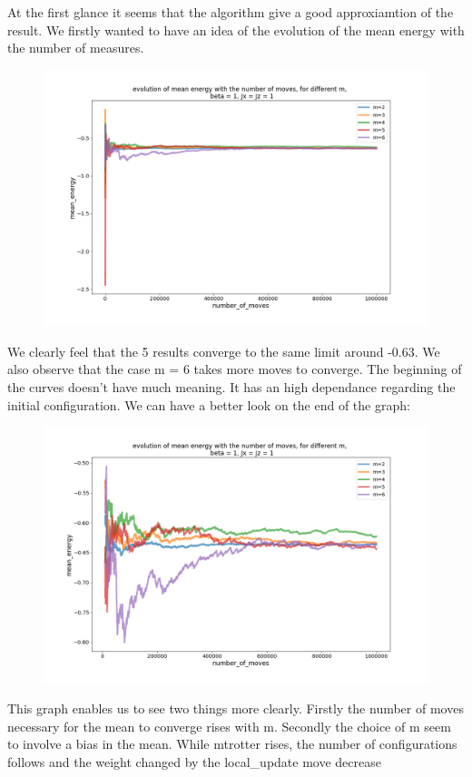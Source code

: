 \documentclass[a4paper,12pt,twoside]{article}
\begin{document}
		 At the first glance it seems that the algorithm give a good approxiamtion of the result. We firstly wanted to have an idea of the evolution of the mean energy with the number of measures.
		 \begin{figure}[!h]
		 	\centering
		 	
		 	\includegraphics[scale=0.4]{meanenrgyevolution_x=z=1_m2-6.png}
		 	
		 	
		 	\label{energy mean evolution}			
		 \end{figure}
		 
		 We clearly feel that the 5 results converge to the same limit around -0.63. We also observe that the case m = 6 takes more moves to converge.
		 The beginning of the curves doesn't have much meaning. It has an high dependance regarding the initial configuration.
		 We can have a better look on the end of the graph:
		 
		 \begin{figure}[H]
		 	\centering
		 	\includegraphics[scale=0.4]{mean_energy_evolution_centerd_x=z=1_m2-6.png}
		 	\label{energy mean evolution}			
		 \end{figure}
		 This graph enables us to see two things more clearly.  Firstly the number of moves necessary for the mean to converge rises with m. Secondly the choice of m seem to involve a bias in the mean.
		 While mtrotter rises, the number of configurations follows and the weight changed by the local\_update move decrease
		 
\end{document}
